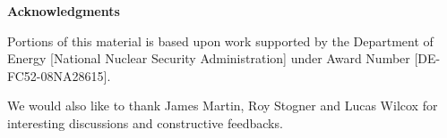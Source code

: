 \centerline{\bf Acknowledgments}

Portions of this material is based upon work supported by the Department of Energy [National Nuclear Security Administration] under Award Number [DE-FC52-08NA28615].

We would also like to thank
James Martin,
Roy Stogner and
Lucas Wilcox
for interesting discussions and constructive feedbacks.

